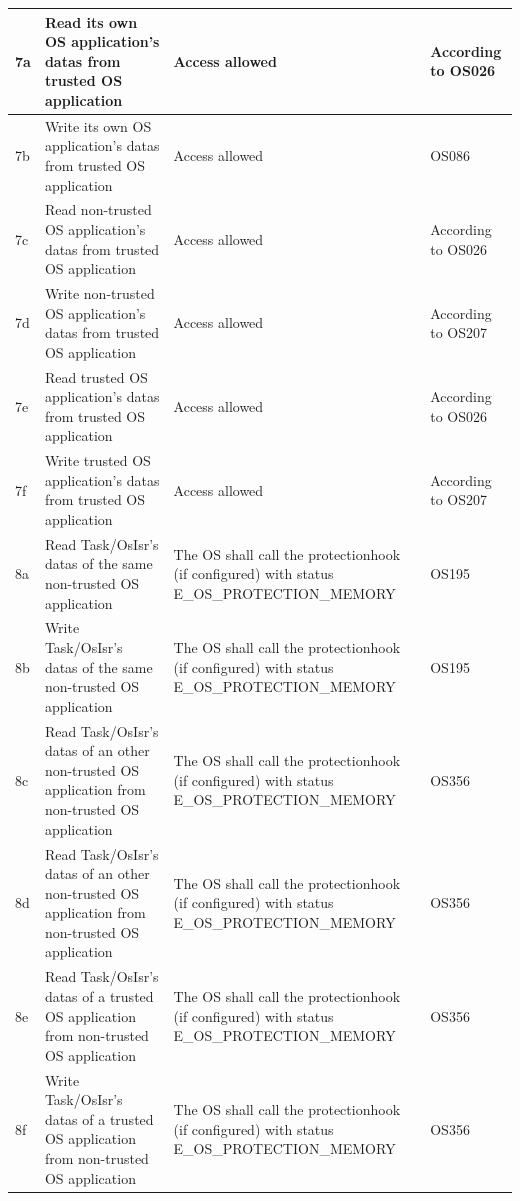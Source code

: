 \documentclass[10pt]{article}
\newlength{\Li}\settowidth{\Li}{Case}
\newlength{\Lii}\setlength{\Lii}{7cm}
\newlength{\Liii}\setlength{\Liii}{\textwidth} \addtolength{\Liii}{-\Li} \addtolength{\Liii}{-\Lii}
\newlength{\Liiii}\setlength{\Liiii}{\textwidth} \addtolength{\Liiii}{-\Li}
\begin{document}
\begin{supertabular}{|p{\Li}|p{\Lii}|p{\Liii}|p{\Liiii}|}
	7a	& Read its own OS application's datas from trusted OS application			&  Access allowed															& According to OS026  \\ \hline
	7b	& Write its own OS application's datas from trusted OS application			&  Access allowed															& OS086  \\ \hline
	7c	& Read non-trusted OS application's datas from trusted OS application		&  Access allowed															& According to OS026 \\ \hline
	7d	& Write non-trusted OS application's datas from trusted OS application		&  Access allowed															& According to OS207 \\ \hline
	7e	& Read trusted OS application's datas from trusted OS application			&  Access allowed															& According to OS026  \\ \hline
	7f	& Write trusted OS application's datas from trusted OS application			&  Access allowed															& According to OS207  \\ \hline
	
	8a	& Read Task/OsIsr's datas of the same non-trusted OS application			& The OS shall call the protectionhook (if configured) with status E\_OS\_PROTECTION\_MEMORY	& OS195 \\ \hline
	8b	& Write Task/OsIsr's datas of the same non-trusted OS application			& The OS shall call the protectionhook (if configured) with status E\_OS\_PROTECTION\_MEMORY	& OS195 \\ \hline
	8c	& Read Task/OsIsr's datas of an other non-trusted OS application from non-trusted OS application 		& The OS shall call the protectionhook (if configured) with status E\_OS\_PROTECTION\_MEMORY	& OS356 \\ \hline
	8d	& Read Task/OsIsr's datas of an other non-trusted OS application from non-trusted OS application 		& The OS shall call the protectionhook (if configured) with status E\_OS\_PROTECTION\_MEMORY	& OS356 \\ \hline
	8e	& Read Task/OsIsr's datas of a trusted OS application from non-trusted OS application 				& The OS shall call the protectionhook (if configured) with status E\_OS\_PROTECTION\_MEMORY	& OS356 \\ \hline
	8f	& Write Task/OsIsr's datas of a trusted OS application from non-trusted OS application 				& The OS shall call the protectionhook (if configured) with status E\_OS\_PROTECTION\_MEMORY	& OS356 \\ \hline
	

\end{supertabular}
\end{document}
